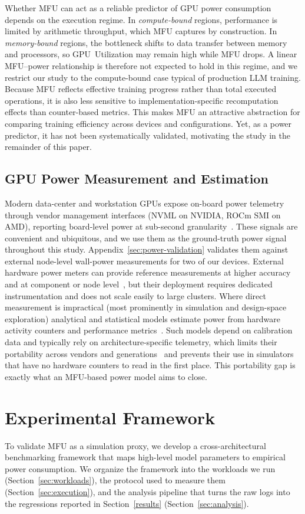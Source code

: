 \documentclass[10pt,conference,letterpaper]{IEEEtran}
\begin{document}
Whether MFU can act as a reliable predictor of GPU power consumption depends on the execution regime.
In \textit{compute-bound} regions, performance is limited by arithmetic throughput, which MFU captures by construction.
In \textit{memory-bound} regions, the bottleneck shifts to data transfer between memory and processors, so GPU~Utilization may remain high while MFU drops.
A linear MFU--power relationship is therefore not expected to hold in this regime, and we restrict our study to the compute-bound case typical of production LLM training.
Because MFU reflects effective training progress rather than total executed operations, it is also less sensitive to implementation-specific recomputation effects than counter-based metrics.
This makes MFU an attractive abstraction for comparing training efficiency across devices and configurations.
Yet, as a power predictor, it has not been systematically validated, motivating the study in the remainder of this paper.

\subsection{GPU Power Measurement and Estimation}\label{sec:bg-power}
Modern data-center and workstation GPUs expose on-board power telemetry through vendor management interfaces (NVML on NVIDIA, ROCm SMI on AMD), reporting board-level power at sub-second granularity~\cite{weakley-2025}.
These signals are convenient and ubiquitous, and we use them as the ground-truth power signal throughout this study.
Appendix~\ref{sec:power-validation} validates them against external node-level wall-power measurements for two of our devices.
External hardware power meters can provide reference measurements at higher accuracy and at component or node level~\cite{yang-2024A, jay-2023}, but their deployment requires dedicated instrumentation and does not scale easily to large clusters.
Where direct measurement is impractical (most prominently in simulation and design-space exploration) analytical and statistical models estimate power from hardware activity counters and performance metrics~\cite{lang-2013}.
Such models depend on calibration data and typically rely on architecture-specific telemetry, which limits their portability across vendors and generations~\cite{yang-2024A} and prevents their use in simulators that have no hardware counters to read in the first place.
This portability gap is exactly what an MFU-based power model aims to close.

\section{Experimental Framework}\label{methodology}
To validate MFU as a simulation proxy, we develop a cross-architectural benchmarking framework that maps high-level model parameters to empirical power consumption.
We organize the framework into the workloads we run (Section~\ref{sec:workloads}), the protocol used to measure them (Section~\ref{sec:execution}), and the analysis pipeline that turns the raw logs into the regressions reported in Section~\ref{results} (Section~\ref{sec:analysis}).
\end{document}
